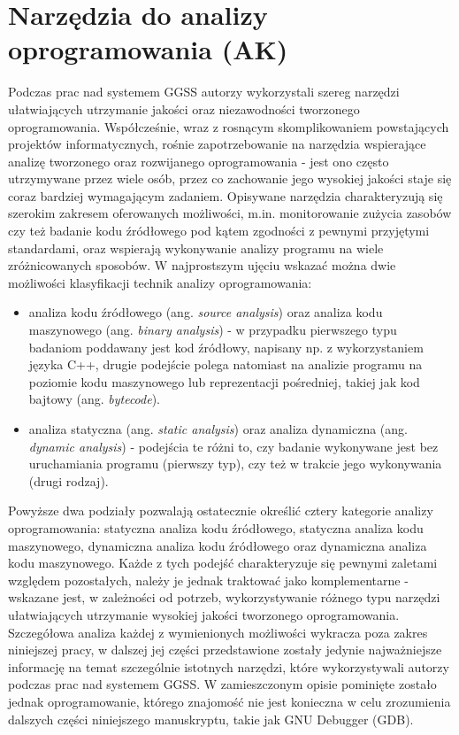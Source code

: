 \section{Narzędzia do analizy oprogramowania (AK)}
Podczas prac nad systemem GGSS autorzy wykorzystali szereg narzędzi ułatwiających utrzymanie jakości oraz niezawodności tworzonego oprogramowania. Współcześnie, wraz z rosnącym skomplikowaniem powstających projektów informatycznych, rośnie zapotrzebowanie na narzędzia wspierające analizę tworzonego oraz rozwijanego oprogramowania - jest ono często utrzymywane przez wiele osób, przez co zachowanie jego wysokiej jakości staje się coraz bardziej wymagającym zadaniem. Opisywane narzędzia charakteryzują się szerokim zakresem oferowanych możliwości, m.in. monitorowanie zużycia zasobów czy też badanie kodu źródłowego pod kątem zgodności z pewnymi przyjętymi standardami, oraz wspierają wykonywanie analizy programu na wiele zróżnicowanych sposobów. W najprostszym ujęciu wskazać można dwie możliwości klasyfikacji technik analizy oprogramowania:
\begin{itemize}
    \item analiza kodu źródłowego (ang. \emph{source analysis}) oraz analiza kodu maszynowego (ang. \emph{binary analysis}) - w przypadku pierwszego typu badaniom poddawany jest kod źródłowy, napisany np. z wykorzystaniem języka C++, drugie podejście polega natomiast na analizie programu na poziomie kodu maszynowego lub reprezentacji pośredniej, takiej jak kod bajtowy (ang. \emph{bytecode}).
    \item analiza statyczna (ang. \emph{static analysis}) oraz analiza dynamiczna (ang. \emph{dynamic analysis}) - podejścia te różni to, czy badanie wykonywane jest bez uruchamiania programu (pierwszy typ), czy też w trakcie jego wykonywania (drugi rodzaj).
\end{itemize}

Powyższe dwa podziały pozwalają ostatecznie określić cztery kategorie analizy oprogramowania: statyczna analiza kodu źródłowego, statyczna analiza kodu maszynowego, dynamiczna analiza kodu źródłowego oraz dynamiczna analiza kodu maszynowego. Każde z tych podejść charakteryzuje się pewnymi zaletami względem pozostałych, należy je jednak traktować jako komplementarne - wskazane jest, w zależności od potrzeb, wykorzystywanie różnego typu narzędzi ułatwiających utrzymanie wysokiej jakości tworzonego oprogramowania. Szczegółowa analiza każdej z wymienionych możliwości wykracza poza zakres niniejszej pracy, w dalszej jej części przedstawione zostały jedynie najważniejsze informację na temat szczególnie istotnych narzędzi, które wykorzystywali autorzy podczas prac nad systemem GGSS. W zamieszczonym opisie pominięte zostało jednak oprogramowanie, którego znajomość nie jest konieczna w celu zrozumienia dalszych części niniejszego manuskryptu, takie jak GNU Debugger (GDB).

